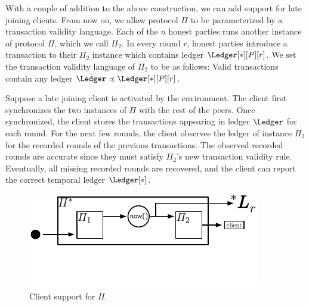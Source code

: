 With a couple of addition to the above construction, we can add support for late joining clients.
From now on, we allow protocol $\Pi$ to be parameterized by a
transaction validity language.
Each of the $n$ honest parties runs another instance of protocol
$\Pi$, which we call $\Pi_2$.
In every round $r$, honest parties introduce a transaction
to their $\Pi_2$ instance which contains ledger $\Ledger[*][P][r]$.
We set the transaction validity language of $\Pi_2$ to be as follows:
Valid transactions contain any ledger $\hat \Ledger \preccurlyeq \Ledger[*][P][r]$.

Suppose a late joining client is activated by the environment.
The client first synchronizes the two instances of $\Pi$ with the
rest of the peers. Once synchronized, the client stores the transactions
appearing in ledger $\Ledger$ for each round.
For the next few rounds, the client observes the ledger of instance $\Pi_2$ for the
recorded rounds of the previous transactions.
The observed recorded rounds are accurate since they must satisfy $\Pi_2$'s
new transaction validity rule.
Eventually, all missing recorded rounds are
recovered, and the client can report the correct temporal ledger $\Ledger[*]$.

\begin{figure}
  \centering
  \includegraphics[width=0.65\columnwidth,keepaspectratio]{figures/clients.pdf}
  \caption{Client support for $\Pi$.
  }
 \label{fig:backward-reduction}
\end{figure}